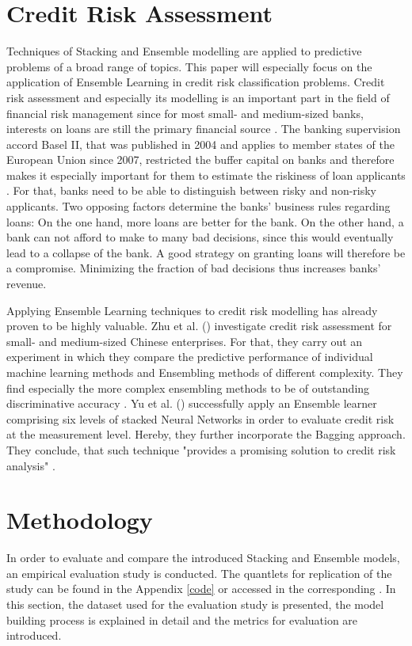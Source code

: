 \documentclass[12pt]{article}
\begin{document}
\section{Credit Risk Assessment}
Techniques of Stacking and Ensemble modelling are applied to predictive problems of a broad range of topics. This paper will especially focus on the application of Ensemble Learning in credit risk classification problems. Credit risk assessment and especially its modelling is an important part in the field of financial risk management since for most small- and medium-sized banks, interests on loans are still the primary financial source \citep[p.2]{jacobson2006internal}. The banking supervision accord Basel II, that was published in 2004 and applies to member states of the European Union since 2007, restricted the buffer capital on banks and therefore makes it especially important for them to estimate the riskiness of loan applicants \citep{basel2}. For that, banks need to be able to distinguish between risky and non-risky applicants. Two opposing factors determine the banks' business rules regarding loans: On the one hand, more loans are better for the bank. On the other hand, a bank can not afford to make to many bad decisions, since this would eventually lead to a collapse of the bank. A good strategy on granting loans will therefore be a compromise. Minimizing the fraction of bad decisions thus increases banks' revenue.

Applying Ensemble Learning techniques to credit risk modelling has already proven to be highly valuable. Zhu et al. (\citeyear{zhu2017comparison}) investigate credit risk assessment for small- and medium-sized Chinese enterprises. For that, they carry out an experiment in which they compare the predictive performance of individual machine learning methods and Ensembling methods of different complexity. They find especially the more complex ensembling methods to be of outstanding discriminative accuracy \citep[p.46f.]{zhu2017comparison}. Yu et al. (\citeyear{yu2008credit}) successfully apply an Ensemble learner comprising six levels of stacked Neural Networks in order to evaluate credit risk at the measurement level. Hereby, they further incorporate the Bagging approach. They conclude, that such technique "provides a promising solution to credit risk analysis" \citep[p.1443]{yu2008credit}. 




\section{Methodology}
In order to evaluate and compare the introduced Stacking and Ensemble models, an empirical evaluation study is conducted. The quantlets for replication of the study can be found in the Appendix \ref{code} or accessed in the corresponding \href{https://github.com/schreckf/NIC_Schreck}{\color{black}{github repository}}. In this section, the dataset used for the evaluation study is presented, the model building process is explained in detail and the metrics for evaluation are introduced.
\end{document}
